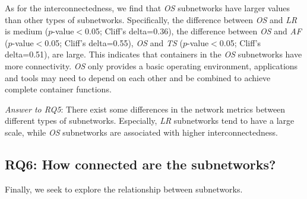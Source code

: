 \documentclass[sigconf]{acmart}
\begin{document}
As for the interconnectedness, we find that \emph{OS} subnetworks have 
larger values than other types of subnetworks. Specifically, the difference between \emph{OS} and \emph{LR} is medium ($p$-value$<$0.05; Cliff's delta=0.36), the difference between \emph{OS} and \emph{AF} ($p$-value$<$0.05; Cliff's delta=0.55), \emph{OS} and \emph{TS} ($p$-value$<$0.05; Cliff's delta=0.51), are large. 
This indicates that containers in the \emph{OS} subnetworks have more connectivity. \emph{OS} only provides a basic operating environment, applications and tools may need to depend on each other and be combined to achieve complete container functions.    





\begin{mybox}
\emph{Answer to RQ5}: 
There exist some differences in the network metrics between different types of subnetworks. Especially, \emph{LR} subnetworks tend to have a large scale, while \emph{OS} subnetworks are associated with higher interconnectedness.
\end{mybox}









\subsection{RQ6: How connected are the subnetworks?}

Finally, we seek to explore the relationship between subnetworks. 
\end{document}
